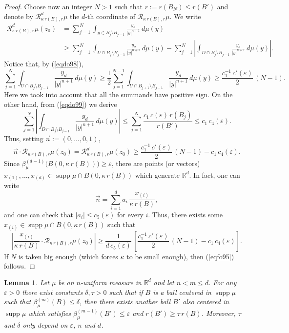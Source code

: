 \documentclass[11pt]{amsart}
\newcommand{\R}{{\mathbb R}}       %
\newcommand{\RR}{{\mathcal R}}
\newcommand{\rf}[1]{{(\ref{#1})}}
\newcommand{\supp}{\operatorname{supp}}
\newcommand{\ve}{{\varepsilon}}
\newcommand{\vv}{{\vspace{2mm}}}
\newtheorem{lemma}[theorem]{Lemma}
\theoremstyle{definition}
\theoremstyle{remark}
\numberwithin{equation}{section}
\begin{document}
\begin{proof}
Choose now an integer $N>1$ such that $r:=r(B_N)\leq r(B')$
and denote by $\RR_{\kappa\,r(B),r}^d\mu$ the $d$-th coordinate of $\RR_{\kappa\,r(B),r}\mu$. We write
\begin{align*}
\RR_{\kappa\,r(B),r}^d\mu(z_0) & = \sum_{j=1}^N \int_{y\in B_j\setminus B_{j-1}}
\frac{y_d}{|y|^{n+1}}\,d\mu(y) \\
& \geq \sum_{j=1}^{N} \int_{U\cap B_{j}\setminus B_{j-1}} \frac{y_d}{|y|^{n+1}}\,d\mu(y) 
-  \sum_{j=1}^N \left|\int_{D\cap B_j\setminus B_{j-1}} \frac{y_d}{|y|^{n+1}}\,d\mu(y)\right|.
\end{align*}
Notice that, by \rf{eqdo98},
$$\sum_{j=1}^{N} \int_{U\cap B_{j}\setminus B_{j-1}} \frac{y_d}{|y|^{n+1}}\,d\mu(y)\geq \frac12
\sum_{j=1}^{N-1} \int_{U\cap B_{j+1}\setminus B_{j-1}} \frac{y_d}{|y|^{n+1}}\,d\mu(y) \geq \frac{c_1^{-1}\,c'(\ve)}2\,(N-1).$$
Here we took into account that all the summands have positive sign. On the other hand, from \rf{eqdo99}
we derive
$$\sum_{j=1}^N \left|\int_{D\cap B_j\setminus B_{j-1}} \frac{y_d}{|y|^{n+1}}\,d\mu(y)\right|
\leq \sum_{j=1}^N \frac{c_1\,c(\ve)\,r(B_j)}{r(B')} \leq c_1\,c_4(\ve).$$
Thus, setting $\vec n := (0,\ldots,0,1)$,
$$\vec n \cdot \RR_{\kappa\,r(B),r}\mu(z_0) =
\RR_{\kappa\,r(B),r}^d\mu(z_0) \geq \frac{c_1^{-1}\,c'(\ve)}2\,(N-1) - c_1\,c_4(\ve).$$
Since $\beta_\mu^{(d-1)}\bigl(B(0,\kappa\,r(B))\bigr)\geq\ve$, there are points (or vectors) $x_{(1)},\ldots,
x_{(d)}\in\supp\mu\cap B(0,\kappa\,r(B))$
which generate $\R^d$. In fact, one can write
$$\vec n = \sum_{i=1}^d a_i\,\frac{x_{(i)}}{\kappa \,r(B)},$$
and one can check that $|a_i|\leq c_5(\ve)$ for every $i$.
Thus, there exists some $x_{(i)}\in\supp\mu\cap B(0,\kappa\,r(B))$ such that
$$\left|\frac{x_{(i)}}{\kappa \,r(B)}\cdot \RR_{\kappa\,r(B),r}\mu(z_0)\right| \geq 
\frac1{d\,c_5(\ve)}\,\left[\frac{c_1^{-1}\,c'(\ve)}2\,(N-1) - c_1\,c_4(\ve)\right].$$
If $N$ is taken big enough (which forces $\kappa$ to be small enough), then \rf{eqfo95} follows.
\end{proof}

\vv

\begin{lemma}\label{lemtouch2}
Let $\mu$ be an $n$-uniform measure in $\R^d$ and let $n<m\leq d$. For any $\ve>0$ there exist constants $\delta,\tau>0$ such that if $B$ is a ball centered in  $\supp\mu$ such that $\beta_\mu^{(m)}(B)\leq \delta$,
then 
 there exists another ball $B'$ also centered in  $\supp\mu$ which satisfies
$\beta_\mu^{(m-1)}(B')\leq\ve$ and $r(B')\geq \tau\,r(B)$. Moreover, $\tau$ and $\delta$ only depend on $\ve$, $n$ and $d$.
\end{lemma}
\end{document}
